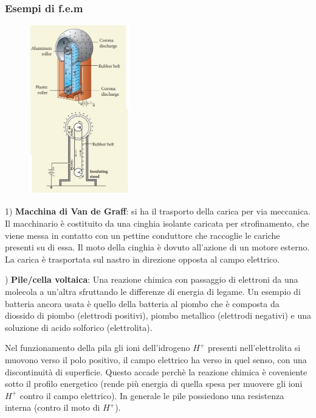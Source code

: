 \subsubsection{Esempi di f.e.m}
 \begin{figure}
  \centering
  \includegraphics[width=0.39\textwidth]{images/van.jpg}
\end{figure}
1) \textbf{Macchina di Van de Graff}: si ha il trasporto della carica per via meccanica. Il macchinario \`e costituito da una cinghia isolante caricata per strofinamento, che viene messa in contatto con un pettine conduttore che raccoglie le cariche presenti su di essa. Il moto della cinghia \`e dovuto all'azione di un motore esterno. La carica \`e trasportata sul nastro in direzione opposta al campo elettrico.
\newline

) \textbf{Pile/cella voltaica}: Una reazione chimica con passaggio di elettroni da una molecola a un'altra sfruttando le differenze di energia di legame. Un esempio di batteria ancora usata \`e quello della batteria al piombo che \`e composta da diossido di piombo (elettrodi positivi), piombo metallico (elettrodi negativi) e una soluzione di acido solforico (elettrolita).

Nel funzionamento della pila gli ioni dell'idrogeno $H^+$ presenti nell'elettrolita si muovono verso il polo positivo, il campo elettrico ha verso in quel senso, con una discontinuit\`a di superficie. Questo accade perch\`e la reazione chimica \`e coveniente sotto il profilo energetico (rende pi\`u energia di quella spesa per muovere gli ioni $H^+$ contro il campo elettrico). In generale le pile possiedono una resistenza interna (contro il moto di $H^+$).

